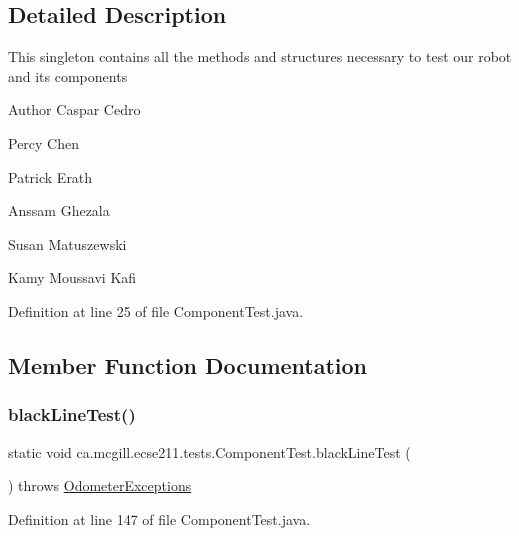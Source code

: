 \subsection{Detailed Description}
This singleton contains all the methods and structures necessary to test our robot and its components

\begin{DoxyAuthor}{Author}
Caspar Cedro 

Percy Chen 

Patrick Erath 

Anssam Ghezala 

Susan Matuszewski 

Kamy Moussavi Kafi 
\end{DoxyAuthor}


Definition at line 25 of file Component\+Test.\+java.



\subsection{Member Function Documentation}
\mbox{\label{enumca_1_1mcgill_1_1ecse211_1_1tests_1_1_component_test_a3f36cee9ca567c845377bec33554ba8b}} 
\subsubsection{\texorpdfstring{black\+Line\+Test()}{blackLineTest()}}
{\footnotesize\ttfamily static void ca.\+mcgill.\+ecse211.\+tests.\+Component\+Test.\+black\+Line\+Test (\begin{DoxyParamCaption}{ }\end{DoxyParamCaption}) throws \hyperlink{classca_1_1mcgill_1_1ecse211_1_1odometer_1_1_odometer_exceptions}{Odometer\+Exceptions}\hspace{0.3cm}{\ttfamily [static]}}



Definition at line 147 of file Component\+Test.\+java.


